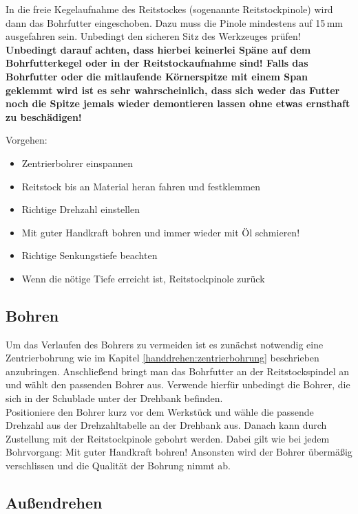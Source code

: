 \documentclass{\basedir/fablab-document}
\begin{document}
In die freie Kegelaufnahme des Reitstockes (sogenannte Reitstockpinole) wird dann das Bohrfutter eingeschoben. Dazu muss die Pinole mindestens auf 15\,mm ausgefahren sein. Unbedingt den sicheren Sitz des Werkzeuges prüfen!\\\textbf{Unbedingt darauf achten, dass hierbei keinerlei Späne auf dem Bohrfutterkegel oder in der Reitstockaufnahme sind! Falls das Bohrfutter oder die mitlaufende Körnerspitze mit einem Span geklemmt wird ist es sehr wahrscheinlich, dass sich weder das Futter noch die Spitze jemals wieder demontieren lassen ohne etwas ernsthaft zu beschädigen!}

Vorgehen:
\begin{itemize}
\item Zentrierbohrer einspannen
\item Reitstock bis an Material heran fahren und festklemmen
\item Richtige Drehzahl einstellen
\item Mit guter Handkraft bohren und immer wieder mit Öl schmieren!
\item Richtige Senkungstiefe beachten
\item Wenn die nötige Tiefe erreicht ist, Reitstockpinole zurück

\end{itemize}

\subsection{Bohren}

Um das Verlaufen des Bohrers zu vermeiden ist es zunächst notwendig eine Zentrierbohrung wie im Kapitel \ref{handdrehen:zentrierbohrung} beschrieben anzubringen. Anschließend bringt man das Bohrfutter an der Reitstockspindel an und wählt den passenden Bohrer aus. Verwende hierfür unbedingt die Bohrer, die sich in der Schublade unter der Drehbank befinden. \\
Positioniere den Bohrer kurz vor dem Werkstück und wähle die passende Drehzahl aus der Drehzahltabelle an der Drehbank aus. Danach kann durch Zustellung mit der Reitstockpinole gebohrt werden. Dabei gilt wie bei jedem Bohrvorgang: Mit guter Handkraft bohren! Ansonsten wird der Bohrer übermäßig verschlissen und die Qualität der Bohrung nimmt ab.

\subsection{Außendrehen} 
\end{document}
